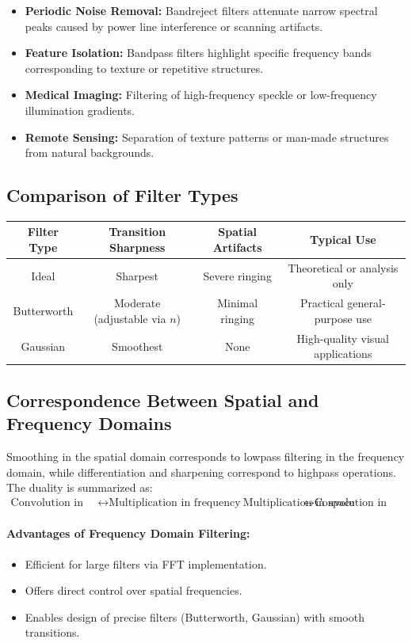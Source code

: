 \documentclass[12pt,a4paper]{AnantDocumentation}
\begin{document}
\begin{itemize}
\item \textbf{Periodic Noise Removal:} Bandreject filters attenuate narrow spectral peaks caused by power line interference or scanning artifacts.
\item \textbf{Feature Isolation:} Bandpass filters highlight specific frequency bands corresponding to texture or repetitive structures.
\item \textbf{Medical Imaging:} Filtering of high-frequency speckle or low-frequency illumination gradients.
\item \textbf{Remote Sensing:} Separation of texture patterns or man-made structures from natural backgrounds.
\end{itemize}

\subsection{Comparison of Filter Types}

\begin{center}
\begin{tabular}{|c|c|c|c|}
\hline
\textbf{Filter Type} & \textbf{Transition Sharpness} & \textbf{Spatial Artifacts} & \textbf{Typical Use} \\
\hline
Ideal & Sharpest & Severe ringing & Theoretical or analysis only \\
Butterworth & Moderate (adjustable via $n$) & Minimal ringing & Practical general-purpose use \\
Gaussian & Smoothest & None & High-quality visual applications \\
\hline
\end{tabular}
\end{center}

\subsection{Correspondence Between Spatial and Frequency Domains}
Smoothing in the spatial domain corresponds to lowpass filtering in the frequency domain, while differentiation and sharpening correspond to highpass operations. The duality is summarized as:
\begin{align}
\text{Convolution in space} &\leftrightarrow \text{Multiplication in frequency} \
\text{Multiplication in space} &\leftrightarrow \text{Convolution in frequency}
\end{align}

\paragraph{Advantages of Frequency Domain Filtering:}
\begin{itemize}
\item Efficient for large filters via FFT implementation.
\item Offers direct control over spatial frequencies.
\item Enables design of precise filters (Butterworth, Gaussian) with smooth transitions.
\end{itemize}
\end{document}
